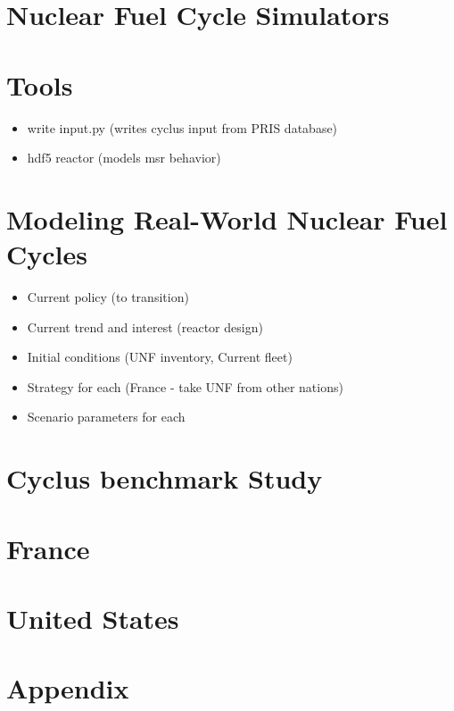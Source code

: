 \documentclass{report}
\begin{document}
\chapter{Nuclear Fuel Cycle Simulators}


\chapter{Tools}
\begin{itemize}
	\item write input.py (writes cyclus input from PRIS database)
	\item hdf5 reactor (models msr behavior)
\end{itemize}

\chapter{Modeling Real-World Nuclear Fuel Cycles}
\begin{itemize}
    \item Current policy (to transition)
    \item Current trend and interest (reactor design)
    \item Initial conditions (UNF inventory, Current fleet)
    \item Strategy for each (France - take UNF from other nations)
    \item Scenario parameters for each
\end{itemize}

\chapter{Cyclus benchmark Study}


\FloatBarrier


\chapter{France}



\chapter{United States}


\chapter{Appendix}






\end{document}
